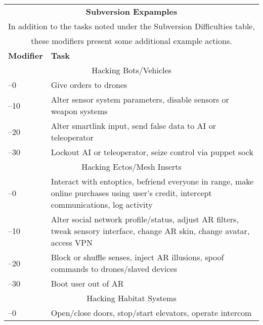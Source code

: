 \begin{table} 

\begin{tabularx}{\textwidth}{|l|X|} 

\hline

\multicolumn{2}{|c|}{\textbf{Subversion Expamples}} \\ \multicolumn{2}{|c|}{In addition to the tasks noted under the Subversion Difficulties table,} \\ \multicolumn{2}{|c|}{these modifiers present some additional example actions.} \\ \hline

\textbf{Modifier} &\textbf{Task} \\ \hline

\multicolumn{2}{|c|}{Hacking Bots/Vehicles} \\ \hline

–0 &Give orders to drones \\ \hline

–10 &Alter sensor system parameters, disable sensors or weapon systems \\ \hline

–20 &Alter smartlink input, send false data to AI or teleoperator \\ \hline

–30 &Lockout AI or teleoperator, seize control via puppet sock \\ \hline

\multicolumn{2}{|c|}{Hacking Ectos/Mesh Inserts} \\ \hline

–0 &Interact with entoptics, befriend everyone in range, make online purchases using user's credit, intercept communications, log activity \\ \hline

–10 &Alter social network profile/status, adjust AR filters, tweak sensory interface, change AR skin, change avatar, access VPN \\ \hline

–20 &Block or shuffle senses, inject AR illusions, spoof commands to drones/slaved devices \\ \hline

–30 &Boot user out of AR \\ \hline

\multicolumn{2}{|c|}{Hacking Habitat Systems} \\ \hline

–0 &Open/close doors, stop/start elevators, operate intercom \\ \hline


\end{tabularx}
\end{table}
